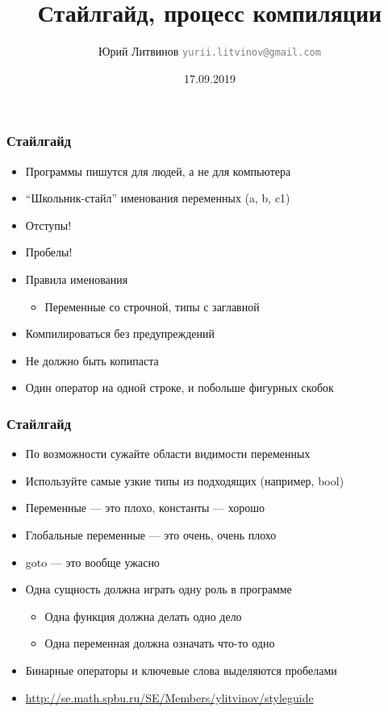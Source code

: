 \documentclass[xetex,mathserif,serif]{beamer}
\title{Стайлгайд, процесс компиляции}
\author[Юрий Литвинов]{Юрий Литвинов \newline \textcolor{gray}{\small\texttt{yurii.litvinov@gmail.com}}}
\date{17.09.2019}
\begin{document}
	
	\frame{\titlepage}
	
	\begin{frame}
		\frametitle{Стайлгайд}
		\begin{itemize}
			\item Программы пишутся для людей, а не для компьютера
			\item ``Школьник-стайл'' именования переменных (a, b, c1)
			\item Отступы!
			\item Пробелы!
			\item Правила именования
			\begin{itemize}
				\item Переменные со строчной, типы с заглавной
			\end{itemize}
			\item Компилироваться без предупреждений
			\item Не должно быть копипаста
			\item Один оператор на одной строке, и побольше фигурных скобок
		\end{itemize}
	\end{frame}

	\begin{frame}
		\frametitle{Стайлгайд}
		\begin{itemize}
			\item По возможности сужайте области видимости переменных
			\item Используйте самые узкие типы из подходящих (например, bool)
			\item Переменные --- это плохо, константы --- хорошо
			\item Глобальные переменные --- это очень, очень плохо
			\item goto --- это вообще ужасно
			\item Одна сущность должна играть одну роль в программе
			\begin{itemize}
				\item Одна функция должна делать одно дело
				\item Одна переменная должна означать что-то одно
			\end{itemize}
			\item Бинарные операторы и ключевые слова выделяются пробелами
			\item \url{http://se.math.spbu.ru/SE/Members/ylitvinov/styleguide}
		\end{itemize}
	\end{frame}
\end{document}
